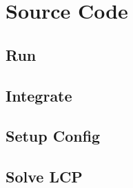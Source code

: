 \documentclass[10pt,oneside,a4paper,final,english]{memoir}
\begin{document}
\appendix
\section{Source Code}

\subsection{Run}


\subsection{Integrate}


\subsection{Setup Config}


\subsection{Solve LCP}

\end{document}
